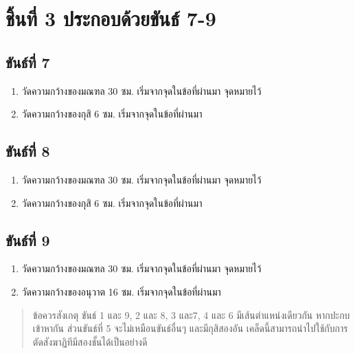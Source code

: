 \section{ชิ้นที่ 3 ประกอบด้วยขันธ์ 7-9}

\subsection{ขันธ์ที่ 7}

\begin{enumerate}
\def\labelenumi{(\arabic{enumi})}
\item
  วัดความกว้างของมณฑล 30 ซม. เริ่มจากจุดในข้อที่ผ่านมา จุดหมายไว้
\item
  วัดความกว้างของกุสิ 6 ซม. เริ่มจากจุดในข้อที่ผ่านมา
\end{enumerate}

\subsection{ขันธ์ที่ 8}

\begin{enumerate}
\def\labelenumi{(\arabic{enumi})}
\item
  วัดความกว้างของมณฑล 30 ซม. เริ่มจากจุดในข้อที่ผ่านมา จุดหมายไว้
\item
  วัดความกว้างของกุสิ 6 ซม. เริ่มจากจุดในข้อที่ผ่านมา
\end{enumerate}

\subsection{ขันธ์ที่ 9}

\begin{enumerate}
\def\labelenumi{(\arabic{enumi})}
\item
  วัดความกว้างของมณฑล 30 ซม. เริ่มจากจุดในข้อที่ผ่านมา จุดหมายไว้
\item
  วัดความกว้างของอนุวาต 16 ซม. เริ่มจากจุดในข้อที่ผ่านมา
\end{enumerate}

\begin{quote}
ข้อควรสังเกตุ ขันธ์ 1 และ 9, 2 และ 8, 3 และ7, 4 และ 6 มีเส้นตำแหน่งเดียวกัน
หากปะกบเข้าหากัน ส่วนขันธ์ที่ 5 จะไม่เหมือนขันธ์อื่นๆ และมีกุสิสองอัน
เคล็ดนี้สามารถนำไปใช้กับการตัดสังฆาฏิทีมีสองชั้นได้เป็นอย่างดี
\end{quote}

